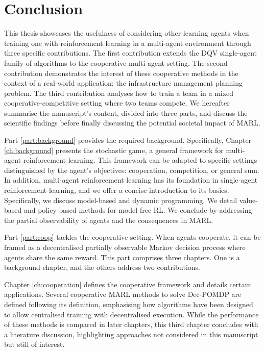 \chapter{Conclusion}\label{ch:conclusion}

This thesis showcases the usefulness of considering other learning agents when training one with reinforcement learning in a multi-agent environment through three specific contributions.
The first contribution extends the DQV single-agent family of algorithms to the cooperative multi-agent setting.
The second contribution demonstrates the interest of these cooperative methods in the context of a real-world application: the infrastructure management planning problem.
The third contribution analyses how to train a team in a mixed cooperative-competitive setting where two teams compete.
We hereafter summarise the manuscript's content, divided into three parts, and discuss the scientific findings before finally discussing the potential societal impact of MARL.

Part \ref{part:background} provides the required background.
Specifically, Chapter \ref{ch:background} presents the stochastic game, a general framework for multi-agent reinforcement learning. 
This framework can be adapted to specific settings distinguished by the agent's objectives: cooperation, competition, or general sum.
In addition, multi-agent reinforcement learning has its foundation in single-agent reinforcement learning, and we offer a concise introduction to its basics.
Specifically, we discuss model-based and dynamic programming.
We detail value-based and policy-based methods for model-free RL.
We conclude by addressing the partial observability of agents and the consequences in MARL.

Part \ref{part:coop} tackles the cooperative setting.
When agents cooperate, it can be framed as a decentralised partially observable Markov decision process where agents share the same reward.
This part comprises three chapters.
One is a background chapter, and the others address two contributions.

Chapter \ref{ch:cooperation} defines the cooperative framework and details certain applications.
Several cooperative MARL methods to solve Dec-POMDP are defined following its definition, emphasising how algorithms have been designed to allow centralised training with decentralised execution.
While the performance of these methods is compared in later chapters, this third chapter concludes with a literature discussion, highlighting approaches not considered in this manuscript but still of interest.

